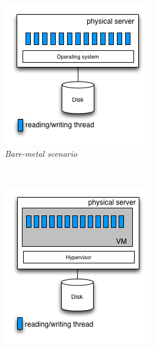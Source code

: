 \documentclass{acmsig}
\begin{document}
\begin{figure}[t]
   \centering
   \begin{subfigure}[b]{0.3\textwidth}
     \includegraphics[width=\textwidth]{figures/bare-metal.png}
     \caption{\textit{Bare-metal scenario}}
     \label{fig:bm}
   \end{subfigure}%
   ~ %
   \begin{subfigure}[b]{0.3\textwidth}
     \includegraphics[width=\textwidth]{figures/SVM-MT.png}

\end{subfigure}
\end{figure}
\end{document}

